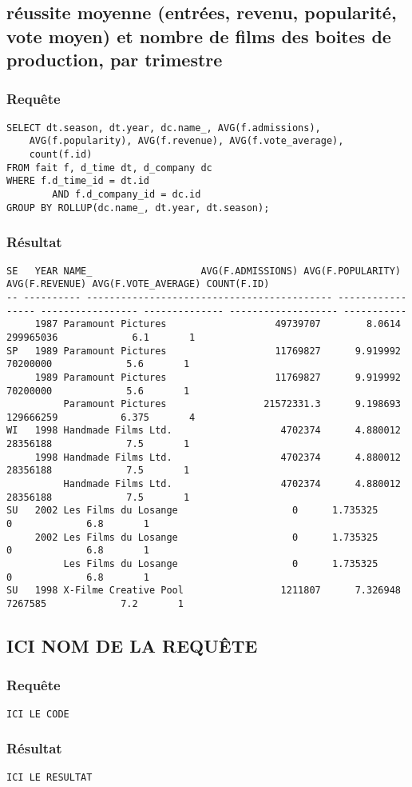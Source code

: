 \subsection{réussite moyenne (entrées, revenu, popularité, vote moyen) et nombre de films des boites de production, par trimestre}
\subsubsection{Requête}
\begin{lstlisting}
SELECT dt.season, dt.year, dc.name_, AVG(f.admissions),
	AVG(f.popularity), AVG(f.revenue), AVG(f.vote_average),
	count(f.id)
FROM fait f, d_time dt, d_company dc
WHERE f.d_time_id = dt.id
		AND f.d_company_id = dc.id
GROUP BY ROLLUP(dc.name_, dt.year, dt.season);
\end{lstlisting}
\subsubsection{Résultat}
\begin{lstlisting}
SE	 YEAR NAME_					  AVG(F.ADMISSIONS) AVG(F.POPULARITY) AVG(F.REVENUE) AVG(F.VOTE_AVERAGE) COUNT(F.ID)
-- ---------- ------------------------------------------- ----------------- ----------------- -------------- ------------------- -----------
	 1987 Paramount Pictures				   49739707	       8.0614	   299965036		     6.1	   1
SP	 1989 Paramount Pictures				   11769827	     9.919992	    70200000		     5.6	   1
	 1989 Paramount Pictures				   11769827	     9.919992	    70200000		     5.6	   1
	      Paramount Pictures				 21572331.3	     9.198693	   129666259		   6.375	   4
WI	 1998 Handmade Films Ltd.				    4702374	     4.880012	    28356188		     7.5	   1
	 1998 Handmade Films Ltd.				    4702374	     4.880012	    28356188		     7.5	   1
	      Handmade Films Ltd.				    4702374	     4.880012	    28356188		     7.5	   1
SU	 2002 Les Films du Losange					  0	     1.735325		   0		     6.8	   1
	 2002 Les Films du Losange					  0	     1.735325		   0		     6.8	   1
	      Les Films du Losange					  0	     1.735325		   0		     6.8	   1
SU	 1998 X-Filme Creative Pool				    1211807	     7.326948	     7267585		     7.2	   1

\end{lstlisting}

\subsection{ICI NOM DE LA REQUÊTE}
\subsubsection{Requête}
\begin{lstlisting}
ICI LE CODE
\end{lstlisting}
\subsubsection{Résultat}
\begin{lstlisting}
ICI LE RESULTAT
\end{lstlisting}
